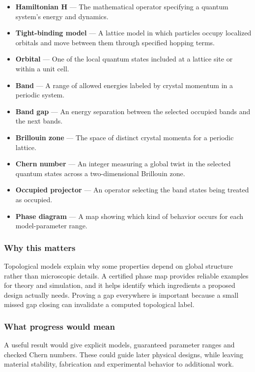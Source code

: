 \documentclass[
  11pt,
]{article}
\begin{document}
\begin{itemize}
\item
  \textbf{Hamiltonian H} --- The mathematical operator specifying a
  quantum system's energy and dynamics.
\item
  \textbf{Tight-binding model} --- A lattice model in which particles
  occupy localized orbitals and move between them through specified
  hopping terms.
\item
  \textbf{Orbital} --- One of the local quantum states included at a
  lattice site or within a unit cell.
\item
  \textbf{Band} --- A range of allowed energies labeled by crystal
  momentum in a periodic system.
\item
  \textbf{Band gap} --- An energy separation between the selected
  occupied bands and the next bands.
\item
  \textbf{Brillouin zone} --- The space of distinct crystal momenta for
  a periodic lattice.
\item
  \textbf{Chern number} --- An integer measuring a global twist in the
  selected quantum states across a two-dimensional Brillouin zone.
\item
  \textbf{Occupied projector} --- An operator selecting the band states
  being treated as occupied.
\item
  \textbf{Phase diagram} --- A map showing which kind of behavior occurs
  for each model-parameter range.
\end{itemize}

\subsubsection{Why this matters}

Topological models explain why some properties depend on global
structure rather than microscopic details. A certified phase map
provides reliable examples for theory and simulation, and it helps
identify which ingredients a proposed design actually needs. Proving a
gap everywhere is important because a small missed gap closing can
invalidate a computed topological label.

\subsubsection{What progress would mean}

A useful result would give explicit models, guaranteed parameter ranges
and checked Chern numbers. These could guide later physical designs,
while leaving material stability, fabrication and experimental behavior
to additional work.
\end{document}
